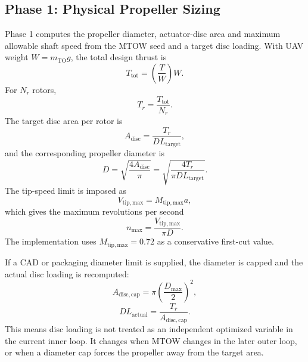\subsection{Phase 1: Physical Propeller Sizing}
\label{subsec:ppa_phase1}

Phase 1 computes the propeller diameter, actuator-disc area and maximum allowable shaft speed from the MTOW seed and a target disc loading. With UAV weight \(W=m_{\mathrm{TO}}g\), the total design thrust is
\begin{equation}
    T_{\mathrm{tot}} = \left(\frac{T}{W}\right) W .
    \label{eq:ppa_total_thrust}
\end{equation}
For \(N_r\) rotors,
\begin{equation}
    T_r = \frac{T_{\mathrm{tot}}}{N_r}.
    \label{eq:ppa_per_rotor_thrust}
\end{equation}
The target disc area per rotor is
\begin{equation}
    A_{\mathrm{disc}} = \frac{T_r}{DL_{\mathrm{target}}},
    \label{eq:ppa_disc_area}
\end{equation}
and the corresponding propeller diameter is
\begin{equation}
    D = \sqrt{\frac{4A_{\mathrm{disc}}}{\pi}}
      = \sqrt{\frac{4T_r}{\pi DL_{\mathrm{target}}}} .
    \label{eq:ppa_prop_diameter}
\end{equation}
The tip-speed limit is imposed as
\begin{equation}
    V_{\mathrm{tip,max}} = M_{\mathrm{tip,max}}a,
    \label{eq:ppa_tip_speed}
\end{equation}
which gives the maximum revolutions per second
\begin{equation}
    n_{\max} = \frac{V_{\mathrm{tip,max}}}{\pi D}.
    \label{eq:ppa_nmax}
\end{equation}
The implementation uses \(M_{\mathrm{tip,max}}=0.72\) as a conservative first-cut value.

If a CAD or packaging diameter limit is supplied, the diameter is capped and the actual disc loading is recomputed:
\begin{equation}
    A_{\mathrm{disc,cap}} = \pi\left(\frac{D_{\max}}{2}\right)^2 ,
    \label{eq:ppa_disc_cap_area}
\end{equation}
\begin{equation}
    DL_{\mathrm{actual}} = \frac{T_r}{A_{\mathrm{disc,cap}}}.
    \label{eq:ppa_actual_dl}
\end{equation}
This means disc loading is not treated as an independent optimized variable in the current inner loop. It changes when MTOW changes in the later outer loop, or when a diameter cap forces the propeller away from the target area.

